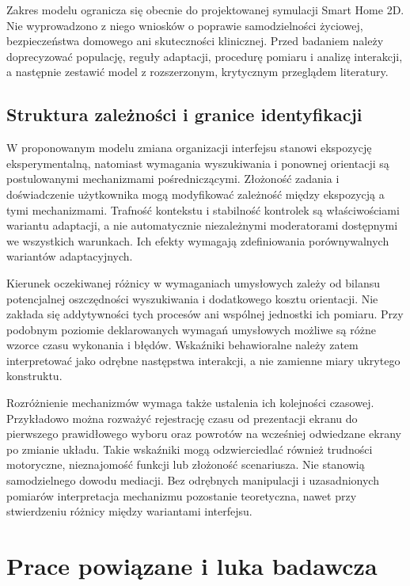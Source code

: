 \documentclass[11pt,a4paper]{article}
\begin{document}
Zakres modelu ogranicza się obecnie do projektowanej symulacji Smart Home 2D. Nie wyprowadzono z niego wniosków o poprawie samodzielności życiowej, bezpieczeństwa domowego ani skuteczności klinicznej. Przed badaniem należy doprecyzować populację, reguły adaptacji, procedurę pomiaru i analizę interakcji, a następnie zestawić model z rozszerzonym, krytycznym przeglądem literatury.

\subsection{Struktura zależności i granice identyfikacji}

W proponowanym modelu zmiana organizacji interfejsu stanowi ekspozycję eksperymentalną, natomiast wymagania wyszukiwania i ponownej orientacji są postulowanymi mechanizmami pośredniczącymi. Złożoność zadania i doświadczenie użytkownika mogą modyfikować zależność między ekspozycją a tymi mechanizmami. Trafność kontekstu i stabilność kontrolek są właściwościami wariantu adaptacji, a nie automatycznie niezależnymi moderatorami dostępnymi we wszystkich warunkach. Ich efekty wymagają zdefiniowania porównywalnych wariantów adaptacyjnych.

Kierunek oczekiwanej różnicy w wymaganiach umysłowych zależy od bilansu potencjalnej oszczędności wyszukiwania i dodatkowego kosztu orientacji. Nie zakłada się addytywności tych procesów ani wspólnej jednostki ich pomiaru. Przy podobnym poziomie deklarowanych wymagań umysłowych możliwe są różne wzorce czasu wykonania i błędów. Wskaźniki behawioralne należy zatem interpretować jako odrębne następstwa interakcji, a nie zamienne miary ukrytego konstruktu.

Rozróżnienie mechanizmów wymaga także ustalenia ich kolejności czasowej. Przykładowo można rozważyć rejestrację czasu od prezentacji ekranu do pierwszego prawidłowego wyboru oraz powrotów na wcześniej odwiedzane ekrany po zmianie układu. Takie wskaźniki mogą odzwierciedlać również trudności motoryczne, nieznajomość funkcji lub złożoność scenariusza. Nie stanowią samodzielnego dowodu mediacji. Bez odrębnych manipulacji i uzasadnionych pomiarów interpretacja mechanizmu pozostanie teoretyczna, nawet przy stwierdzeniu różnicy między wariantami interfejsu.

\section{Prace powiązane i luka badawcza}
\end{document}
